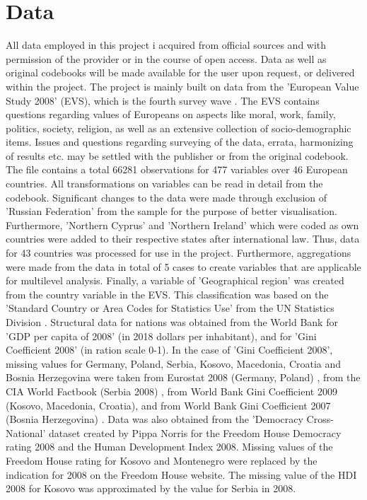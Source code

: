\documentclass[preprint,12pt,authoryear]{elsarticle}
\begin{document}
\section{Data}
All data employed in this project i acquired from official sources and with permission of the provider or in the course of open access. Data as well as original codebooks will be made available for the user upon request, or delivered within the project.
The project is mainly built on data from the 'European Value Study 2008' (EVS), which is the fourth survey wave \citep{evs_european_2016}. The EVS contains questions regarding values of Europeans on aspects like moral, work, family, politics, society, religion, as well as an extensive collection of socio-demographic items. Issues and questions regarding surveying of the data, errata, harmonizing of results etc. may be settled with the publisher or from the original codebook. The file contains a total 66281 observations for 477 variables over 46 European countries. All transformations on variables can be read in detail from the codebook. Significant changes to the data were made through exclusion of 'Russian Federation' from the sample for the purpose of better visualisation. Furthermore, 'Northern Cyprus' and 'Northern Ireland' which were coded as own countries were added to their respective states after international law. Thus, data for 43 countries was processed for use in the project. Furthermore, aggregations were made from the data in total of 5 cases to create variables that are applicable for multilevel analysis. Finally, a variable of 'Geographical region' was created from the country variable in the EVS. This classification was based on the 'Standard Country or Area Codes for Statistics Use' from the UN Statistics Division \citep{unsd_standard_2019}.
Structural data for nations was obtained from the World Bank for 'GDP per capita of 2008' (in 2018 dollars per inhabitant)\citep{world_bank_gdp_2019}, and for 'Gini Coefficient 2008' (in ration scale 0-1)\citep{world_bank_gini_2019}. In the case of 'Gini Coefficient 2008', missing values for Germany, Poland, Serbia, Kosovo, Macedonia, Croatia and Bosnia Herzegovina were taken from Eurostat 2008 (Germany, Poland) \citep{eurostat_eurostat_2019}, from the CIA World Factbook (Serbia 2008) \citep{central_intelligence_agency_serbia_2019}, from World Bank Gini Coefficient 2009 (Kosovo, Macedonia, Croatia), and from World Bank Gini Coefficient 2007 (Bosnia Herzegovina) \citep{world_bank_gini_2019}. Data was also obtained from the 'Democracy Cross-National' dataset created by Pippa Norris \citep{norris_data_2015} for the Freedom House Democracy rating 2008 and the Human Development Index 2008. Missing values of the Freedom House rating for Kosovo \citep{freedom_house_kosovo_2012} and Montenegro \citep{freedom_house_montenegro_2012} were replaced by the indication for 2008 on the Freedom House website. The missing value of the HDI 2008 for Kosovo was approximated by the value for Serbia in 2008.
	
\end{document}
